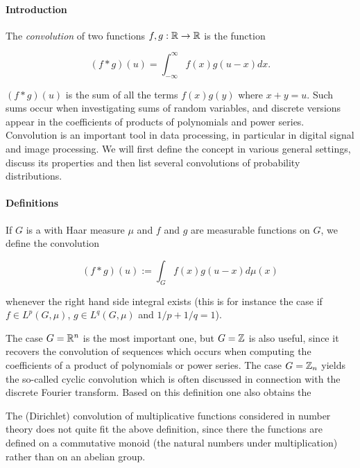 \documentclass[12pt]{article}
\begin{document}

\paragraph{Introduction}

The \emph{convolution} of two functions $f,g : \Bbb{R} \rightarrow \Bbb{R}$ is the function

\[
(f \ast g)(u) = \int_{-\infty}^\infty f(x)g(u-x)dx.
\]

$(f \ast g)(u)$ is the sum of all the terms $f(x)g(y)$ where $x + y = u$. Such sums occur when investigating sums of random variables, and discrete versions appear in the coefficients of products of polynomials and power series. Convolution is an important tool in data processing, in particular in digital signal and image processing. We will first define the concept in various general settings, discuss its properties and then list several convolutions of probability distributions.

\paragraph{Definitions}

If $G$ is a  with Haar measure $\mu$ and $f$ and $g$ are measurable functions on $G$, we define the convolution

\[
(f \ast g)(u) := \int_G f(x)g(u - x)d\mu(x)
\]

whenever the right hand side integral exists (this is for instance the case if $f\in L^p(G,\mu)$, $g\in L^q(G,\mu)$ and $1/p + 1/q = 1$).

The case $G = \Bbb{R}^n$ is the most important one, but $G=\Bbb{Z}$ is also useful, since it recovers the convolution of sequences which occurs when computing the coefficients of a product of polynomials or power series. The case $G=\Bbb{Z}_n$ yields the so-called cyclic convolution which is often discussed in connection with the discrete Fourier transform. Based on this definition one also obtains the 

The (Dirichlet) convolution of multiplicative functions considered in number theory does not quite fit the above definition, since there the functions are defined on a commutative monoid (the natural numbers under multiplication) rather than on an abelian group.
\end{document}
